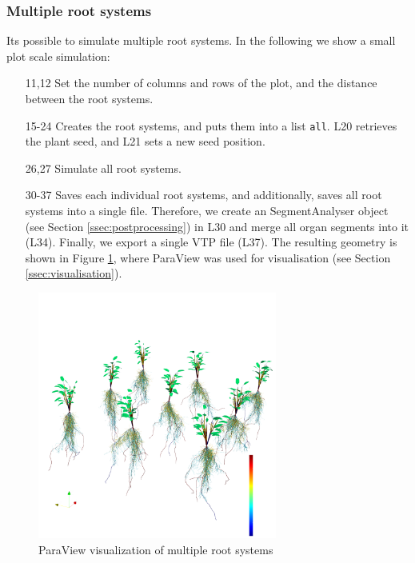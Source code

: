 \subsubsection*{Multiple root systems}

Its possible to simulate multiple root systems. In the following we show a small plot scale simulation:



\begin{itemize}
\item[11,12] Set the number of columns and rows of the plot, and the distance between the root systems.
\item[15-24] Creates the root systems, and puts them into a list \texttt{all}. L20 retrieves the plant seed, and L21 sets a new seed position. 
\item[26,27] Simulate all root systems.
\item[30-37] Saves each individual root systems, and additionally, saves all root systems into a single file. 
Therefore, we create an SegmentAnalyser object (see Section \ref{ssec:postprocessing}) in L30 and merge all organ segments into it (L34). Finally, we export a single VTP file (L37). The resulting geometry is shown in Figure \ref{fig:topics_virtual4}, where ParaView was used for visualisation (see Section \ref{ssec:visualisation}).
\end{itemize}

\begin{figure}
\centering
\includegraphics[width=0.7\textwidth]{figures/topics_virtual4.png}
\caption{ParaView visualization of multiple root systems} \label{fig:topics_virtual4}
\end{figure}



